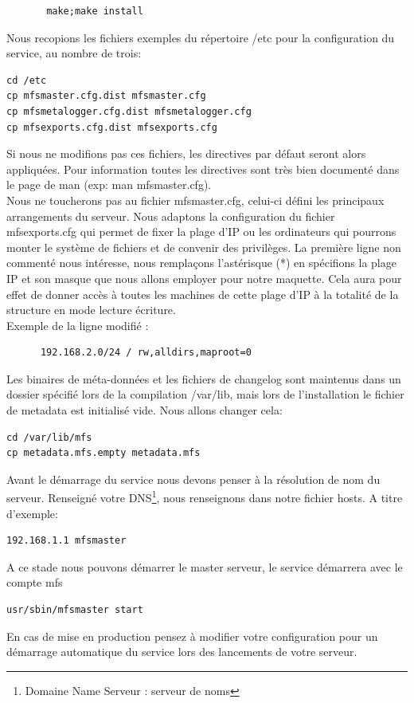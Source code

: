 \documentclass[12pt]{report}
\begin{document}
\begin{lstlisting}
	   make;make install
	  \end{lstlisting}
Nous recopions les fichiers exemples du répertoire /etc pour la configuration du service, au nombre de trois:
\begin{lstlisting}
cd /etc
cp mfsmaster.cfg.dist mfsmaster.cfg
cp mfsmetalogger.cfg.dist mfsmetalogger.cfg
cp mfsexports.cfg.dist mfsexports.cfg
	  \end{lstlisting}
Si nous ne modifions pas ces fichiers, les directives par défaut seront alors appliquées.
Pour information toutes les directives sont très bien documenté dans le page de man (exp: man mfsmaster.cfg).\\
Nous ne toucherons pas au fichier mfsmaster.cfg, celui-ci défini les principaux arrangements du serveur.
Nous adaptons la configuration du fichier mfsexports.cfg qui permet de fixer la plage d'IP ou les ordinateurs qui pourrons monter le système de fichiers et de convenir des privilèges.
La première ligne non commenté nous intéresse, nous remplaçons l'astérisque (*) en spécifions la plage IP et son masque que nous allons employer pour notre maquette.
Cela aura pour effet de donner accès à toutes les machines de cette plage d'IP à la totalité de la structure en mode lecture écriture.\\
Exemple de la ligne modifié :
\begin{lstlisting}
	  192.168.2.0/24 / rw,alldirs,maproot=0
	  \end{lstlisting}
Les binaires de méta-données et les fichiers de changelog sont maintenus dans un dossier spécifié lors de la compilation /var/lib, mais lors de l'installation le fichier de metadata est initialisé vide.
Nous allons changer cela: 
\begin{lstlisting}
cd /var/lib/mfs
cp metadata.mfs.empty metadata.mfs
	  \end{lstlisting}
Avant le démarrage du service nous devons penser à la résolution de nom du serveur. Renseigné votre DNS\footnote{Domaine Name Serveur : serveur de noms}, nous renseignons dans notre fichier hosts.
A titre d'exemple:
  \begin{lstlisting}
192.168.1.1 mfsmaster
	  \end{lstlisting}
A ce stade nous pouvons démarrer le master serveur, le service démarrera avec le compte mfs
  \begin{lstlisting}
usr/sbin/mfsmaster start
	  \end{lstlisting}
En cas de mise en production pensez à modifier votre configuration pour un démarrage automatique du service lors des lancements de votre serveur.
\end{document}
